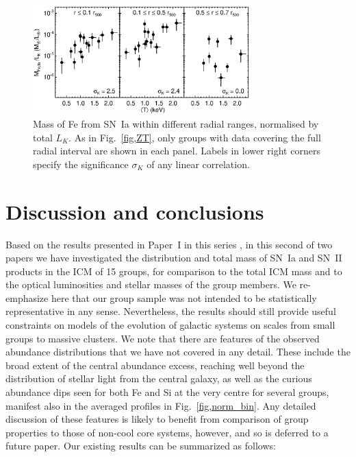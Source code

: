 \documentclass[useAMS,usenatbib]{mn2e}
\begin{document}
\begin{figure} 
 \includegraphics[width=84mm]{fig20.eps}
 \caption{Mass of Fe from SN~Ia within different radial ranges,
   normalised by total $L_K$. As in Fig.~\ref{fig,ZT}, only groups
   with data covering the full radial interval are shown in each
   panel. Labels in lower right corners specify the significance
   $\sigma_K$ of any linear correlation.}
\label{fig,snia} 
\end{figure}  



 
\section{Discussion and conclusions}\label{sec,conclude} 

Based on the results presented in Paper~I in this series
\citep{rasm07}, in this second of two papers we have investigated the
distribution and total mass of SN~Ia and SN~II products in the ICM of
15 groups, for comparison to the total ICM mass and to the optical
luminosities and stellar masses of the group members. We re-emphasize
here that our group sample was not intended to be statistically
representative in any sense. Nevertheless, the results should still
provide useful constraints on models of the evolution of galactic
systems on scales from small groups to massive clusters. We note that
there are features of the observed abundance distributions that we
have not covered in any detail. These include the broad extent of the
central abundance excess, reaching well beyond the distribution of
stellar light from the central galaxy, as well as the curious
abundance dips seen for both Fe and Si at the very centre for several
groups, manifest also in the averaged profiles in
Fig.~\ref{fig,norm_bin}.  Any detailed discussion of these features is
likely to benefit from comparison of group properties to those of
non-cool core systems, however, and so is deferred to a future paper.
Our existing results can be summarized as follows:
\end{document}
